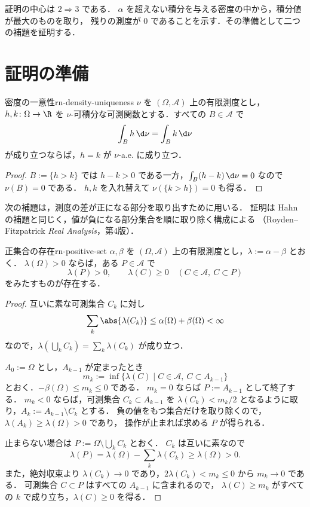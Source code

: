 証明の中心は $2\Rightarrow3$ である．
$\alpha$ を超えない積分を与える密度の中から，積分値が最大のものを取り，
残りの測度が $0$ であることを示す．その準備として二つの補題を証明する．

\section{証明の準備}

\begin{lemma}{密度の一意性}{rn-density-uniqueness}
  $\nu$ を $(\Omega,\mathcal{A})$ 上の有限測度とし，
  $h,k\colon\Omega\to\R$ を $\nu$-可積分な可測関数とする．すべての $B\in\mathcal{A}$ で
  \[
    \int_Bh\,\d\nu=\int_Bk\,\d\nu
  \]
  が成り立つならば，$h=k$ が $\nu$-a.e. に成り立つ．
\end{lemma}

\begin{proof}
  $B:=\{h>k\}$ では $h-k>0$ である一方，$\int_B(h-k)\,\d\nu=0$ なので $\nu(B)=0$ である．
  $h,k$ を入れ替えて $\nu(\{k>h\})=0$ も得る．
\end{proof}

次の補題は，測度の差が正になる部分を取り出すために用いる．
証明は Hahn の補題と同じく，値が負になる部分集合を順に取り除く構成による
（Royden--Fitzpatrick \emph{Real Analysis}，第4版）．

\begin{lemma}{正集合の存在}{rn-positive-set}
  $\alpha,\beta$ を $(\Omega,\mathcal{A})$ 上の有限測度とし，$\lambda:=\alpha-\beta$ とおく．
  $\lambda(\Omega)>0$ ならば，ある $P\in\mathcal{A}$ で
  \[
    \lambda(P)>0,\qquad
    \lambda(C)\geq0\quad(C\in\mathcal{A},\ C\subset P)
  \]
  をみたすものが存在する．
\end{lemma}

\begin{proof}
  互いに素な可測集合 $C_k$ に対し
  \[
    \sum_k\abs{\lambda(C_k)}\leq\alpha(\Omega)+\beta(\Omega)<\infty
  \]
  なので，$\lambda(\bigcup_kC_k)=\sum_k\lambda(C_k)$ が成り立つ．

  $A_0:=\Omega$ とし，$A_{k-1}$ が定まったとき
  \[
    m_k:=\inf\{\lambda(C)\mid C\in\mathcal{A},\ C\subset A_{k-1}\}
  \]
  とおく．$-\beta(\Omega)\leq m_k\leq0$ である．
  $m_k=0$ ならば $P:=A_{k-1}$ として終了する．
  $m_k<0$ ならば，可測集合 $C_k\subset A_{k-1}$ を
  $\lambda(C_k)<m_k/2$ となるように取り，$A_k:=A_{k-1}\setminus C_k$ とする．
  負の値をもつ集合だけを取り除くので，$\lambda(A_k)\geq\lambda(\Omega)>0$ であり，
  操作が止まれば求める $P$ が得られる．

  止まらない場合は $P:=\Omega\setminus\bigcup_kC_k$ とおく．
  $C_k$ は互いに素なので
  \[
    \lambda(P)=\lambda(\Omega)-\sum_k\lambda(C_k)\geq\lambda(\Omega)>0.
  \]
  また，絶対収束より $\lambda(C_k)\to0$ であり，$2\lambda(C_k)<m_k\leq0$ から $m_k\to0$ である．
  可測集合 $C\subset P$ はすべての $A_{k-1}$ に含まれるので，
  $\lambda(C)\geq m_k$ がすべての $k$ で成り立ち，$\lambda(C)\geq0$ を得る．
\end{proof}


